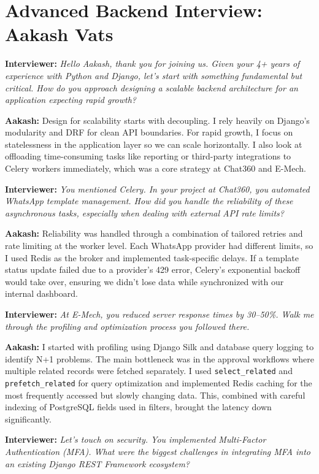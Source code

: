 \documentclass[12pt, a4paper]{article}
\newcommand{\interviewer}[1]{\noindent\textbf{Interviewer: }\textit{#1}\par\vspace{5pt}}
\newcommand{\candidate}[1]{\noindent\textbf{Aakash: }#1\par\vspace{15pt}}
\begin{document}
\section*{Advanced Backend Interview: Aakash Vats}

\interviewer{Hello Aakash, thank you for joining us. Given your 4+ years of experience with Python and Django, let's start with something fundamental but critical. How do you approach designing a scalable backend architecture for an application expecting rapid growth?}

\candidate{Design for scalability starts with decoupling. I rely heavily on Django's modularity and DRF for clean API boundaries. For rapid growth, I focus on statelessness in the application layer so we can scale horizontally. I also look at offloading time-consuming tasks like reporting or third-party integrations to Celery workers immediately, which was a core strategy at Chat360 and E-Mech.}

\interviewer{You mentioned Celery. In your project at Chat360, you automated WhatsApp template management. How did you handle the reliability of these asynchronous tasks, especially when dealing with external API rate limits?}

\candidate{Reliability was handled through a combination of tailored retries and rate limiting at the worker level. Each WhatsApp provider had different limits, so I used Redis as the broker and implemented task-specific delays. If a template status update failed due to a provider's 429 error, Celery's exponential backoff would take over, ensuring we didn't lose data while synchronized with our internal dashboard.}

\interviewer{At E-Mech, you reduced server response times by 30--50\%. Walk me through the profiling and optimization process you followed there.}

\candidate{I started with profiling using Django Silk and database query logging to identify N+1 problems. The main bottleneck was in the approval workflows where multiple related records were fetched separately. I used \texttt{select\_related} and \texttt{prefetch\_related} for query optimization and implemented Redis caching for the most frequently accessed but slowly changing data. This, combined with careful indexing of PostgreSQL fields used in filters, brought the latency down significantly.}

\interviewer{Let's touch on security. You implemented Multi-Factor Authentication (MFA). What were the biggest challenges in integrating MFA into an existing Django REST Framework ecosystem?}
\end{document}
